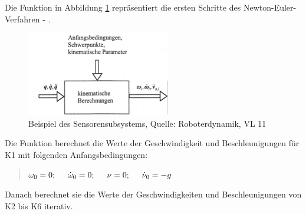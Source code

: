 \subsubsection{}

Die Funktion in Abbildung \ref{fig:sensoren_subsystem_VL} repräsentiert die ersten Schritte des Newton-Euler-Verfahren - .

\begin{figure}[!htbp]
	\centering
	\includegraphics[width=0.42\linewidth]{grafic/compute_kinematics_diagramm}
	\caption{Beispiel des Sensorensubsystems, Quelle: Roboterdynamik, VL 11}
	\label{fig:sensoren_subsystem_VL}
\end{figure}


Die Funktion berechnet die Werte der Geschwindigkeit und Beschleunigungen für K1 mit folgenden Anfangsbedingungen:

\begin{quote}
	$\omega_0 = 0; \hspace{0.5cm} \dot{\omega}_0 = 0; \hspace{0.5cm} \nu = 0; \hspace{0.5cm} \dot{\nu}_0 = -g $
\end{quote}



Danach berechnet sie die Werte der Geschwindigkeiten und Beschleunigungen von K2 bis K6 iterativ.

